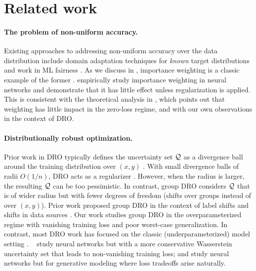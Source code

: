 \section{Related work}

\paragraph{The problem of non-uniform accuracy.}
Existing approaches to addressing non-uniform accuracy over the data distribution include
domain adaptation techniques for \emph{known} target distributions \citep{bendavid2006analysis,ganin2015domain}
and work in ML fairness \citep{dwork2012,hardt2016,kleinberg2017}.
As we discuss in , importance weighting is a classic example of the former \citep{shimodaira2000improving}.
\citet{byrd2019effect} empirically study importance weighting in neural networks and demonstrate that it has little effect unless regularization is applied.
This is consistent with the theoretical analysis in \citet{wen2014robust},
which points out that weighting has little impact in the zero-loss regime,
and with our own observations in the context of DRO.

\paragraph{Distributionally robust optimization.}
Prior work in DRO typically defines the uncertainty set $\mathcal{Q}$
as a divergence ball around the training distribution over $(x,y)$ \citep{bental2013robust,  lam2015quantifying,
duchi2016, miyato2018virtual, esfahani2018data, bertsimas2018data, blanchet2019quantifying}.
With small divergence balls of radii $O(1/n)$,
DRO acts as a regularizer \citep{shafieezadeh2015distributionally, namkoong2017variance}.
However, when the radius is larger, the resulting $\mathcal{Q}$ can be too pessimistic.
In contrast, group DRO considers $\mathcal{Q}$ that is of wider radius but with fewer degrees of freedom (shifts over groups instead of over $(x,y)$).
Prior work proposed group DRO in the context of label shifts \citep{hu2018does} and shifts in data sources \citep{oren2019drolm}.
Our work studies group DRO in the overparameterized regime with vanishing training loss and poor worst-case generalization.
In contrast,
most DRO work has focused on the classic (underparameterized) model setting \citep{namkoong2017variance,hu2018does,duchi2019distributionally}.
~\citet{sinha2018certifiable} study neural networks but with a more conservative Wasserstein uncertainty set that leads to non-vanishing training loss; and \citet{oren2019drolm} study neural networks but for generative modeling where loss tradeoffs arise naturally.

